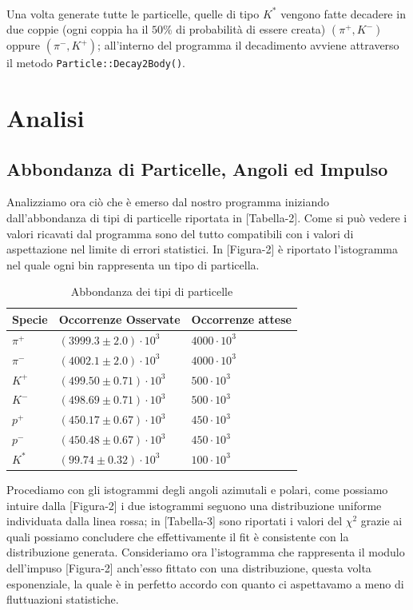\documentclass[a4paper,10 pt]{article}
\begin{document}
\
\\
Una volta generate tutte le particelle, quelle di tipo $K^*$ vengono fatte decadere in due coppie (ogni coppia ha il $50\%$ di probabilità di essere creata)
$(\pi^+, K^-)$ oppure $(\pi^-, K^+)$; all'interno del programma il decadimento avviene attraverso il metodo \verb!Particle::Decay2Body()!.

\section{Analisi}
\subsection{Abbondanza di Particelle, Angoli ed Impulso}
Analizziamo ora ciò che è emerso dal nostro programma iniziando dall'abbondanza di tipi di particelle 
riportata in [Tabella-2]. Come si può vedere i valori ricavati dal programma sono del tutto compatibili 
con i valori di aspettazione nel limite di errori statistici. In [Figura-2] è riportato l'istogramma nel 
quale ogni bin rappresenta un tipo di particella.

\begin{table}[h]
    \centering
    \begin{tabular}{|l|l|l|}
    \hline
    {\bf Specie}  & {\bf Occorrenze Osservate} & {\bf Occorrenze attese} \\ \hline
    $\pi^+$ & $(3999.3 \pm 2.0) \cdot 10^3$ & $4000 \cdot 10^3$ \\ \hline
    $\pi^-$ & $(4002.1 \pm 2.0) \cdot 10^3$ & $4000 \cdot 10^3$ \\ \hline
    $K^+$   & $(499.50 \pm 0.71) \cdot 10^3$ & $500 \cdot 10^3$ \\ \hline
    $K^-$   & $(498.69 \pm 0.71) \cdot 10^3$ & $500 \cdot 10^3$ \\ \hline
    $p^+$   & $(450.17 \pm 0.67) \cdot 10^3$ & $450 \cdot 10^3$ \\ \hline
    $p^-$   & $(450.48 \pm 0.67) \cdot 10^3$ & $450 \cdot 10^3$ \\ \hline
    $K^*$   & $(99.74 \pm 0.32) \cdot 10^3$ & $100 \cdot 10^3$ \\ \hline
    \end{tabular}
    \caption{Abbondanza dei tipi di particelle}
\end{table} 
Procediamo con gli istogrammi degli angoli azimutali e polari, come possiamo intuire dalla [Figura-2] i due istogrammi
seguono una distribuzione uniforme individuata dalla linea rossa; in [Tabella-3] sono riportati i valori del $\chi^2$ grazie
ai quali possiamo concludere che effettivamente il fit è consistente con la distribuzione generata. Consideriamo ora l'istogramma che rappresenta
il modulo dell'impuso [Figura-2] anch'esso fittato con una distribuzione, questa volta esponenziale, la quale è in perfetto accordo con quanto ci 
aspettavamo a meno di fluttuazioni statistiche.
\end{document}
